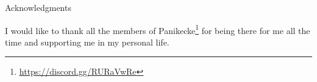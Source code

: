 \thispagestyle{empty}

\vspace*{20mm}

\begin{center}
    { Acknowledgments}
\end{center}

\vspace{10mm}

I would like to thank all the members of Panikecke\footnote{\url{https://discord.gg/RURaVwRe}} for being there for me all the time and supporting me in my personal life.

\cleardoublepage{}
